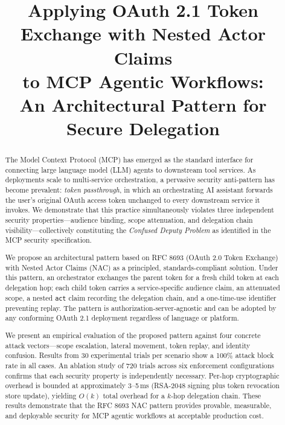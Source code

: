 \documentclass[journal]{IEEEtran}
\begin{document}
\title{Applying OAuth 2.1 Token Exchange with Nested Actor Claims\\
to MCP Agentic Workflows:\\
An Architectural Pattern for Secure Delegation}

\author{
}

\maketitle

\begin{abstract}
The Model Context Protocol (MCP) has emerged as the standard interface for connecting
large language model (LLM) agents to downstream tool services. As deployments scale
to multi-service orchestration, a pervasive security anti-pattern has become
prevalent: \textit{token passthrough}, in which an orchestrating AI assistant
forwards the user's original OAuth access token unchanged to every downstream service
it invokes. We demonstrate that this practice simultaneously violates three
independent security properties—audience binding, scope attenuation, and delegation
chain visibility—collectively constituting the \textit{Confused Deputy Problem} as
identified in the MCP security specification.

We propose an architectural pattern based on RFC 8693 (OAuth 2.0 Token Exchange)
with Nested Actor Claims (NAC) as a principled, standards-compliant solution.
Under this pattern, an orchestrator exchanges the parent token for a fresh child
token at each delegation hop; each child token carries a service-specific audience
claim, an attenuated scope, a nested \texttt{act} claim recording the delegation
chain, and a one-time-use identifier preventing replay. The pattern is
authorization-server-agnostic and can be adopted by any conforming OAuth 2.1
deployment regardless of language or platform.

We present an empirical evaluation of the proposed pattern against four concrete
attack vectors—scope escalation, lateral movement, token replay, and identity
confusion. Results from 30 experimental trials per scenario show a 100\% attack
block rate in all cases. An ablation study of 720 trials across six enforcement
configurations confirms that each security property is independently necessary.
Per-hop cryptographic overhead is bounded at approximately 3--5\,ms
(RSA-2048 signing plus token revocation store update), yielding
$O(k)$ total overhead for a $k$-hop delegation chain. These results
demonstrate that the RFC 8693 NAC pattern provides provable, measurable, and
deployable security for MCP agentic workflows at acceptable production cost.
\end{abstract}
\end{document}
